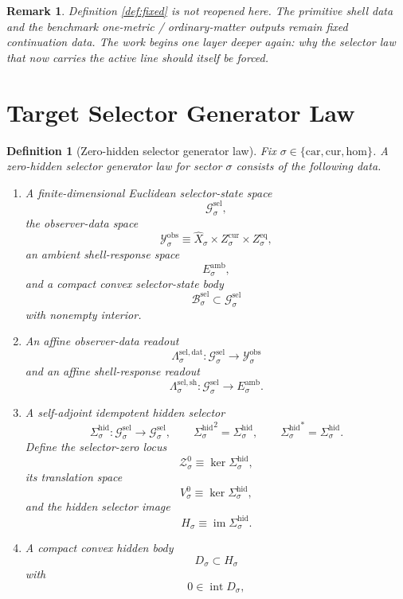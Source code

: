 \documentclass[11pt]{article}
\newcommand{\Car}{\mathrm{car}}
\newcommand{\Cur}{\mathrm{cur}}
\newcommand{\Hom}{\mathrm{hom}}
\newcommand{\VisibleAffine}[1]{\widehat X_{#1}}
\newcommand{\DataSpace}[1]{\mathcal Y_{#1}^{\mathrm{obs}}}
\newcommand{\AmbientTarget}[1]{E_{#1}^{\mathrm{amb}}}
\newcommand{\GapSpace}[1]{H_{#1}}
\newcommand{\GapBody}[1]{D_{#1}}
\newcommand{\GenSpace}[1]{\mathcal G_{#1}^{\mathrm{sel}}}
\newcommand{\GenBody}[1]{\mathcal B_{#1}^{\mathrm{sel}}}
\newcommand{\GenData}[1]{\Lambda_{#1}^{\mathrm{sel,dat}}}
\newcommand{\GenShell}[1]{\Lambda_{#1}^{\mathrm{sel,sh}}}
\newcommand{\HiddenSel}[1]{\Sigma_{#1}^{\mathrm{hid}}}
\newcommand{\ZeroHiddenSlice}[1]{\mathcal Z_{#1}^{0}}
\newcommand{\ZeroHiddenVec}[1]{V_{#1}^{0}}
\newtheorem{definition}{Definition}
\newtheorem{remark}{Remark}
\begin{document}
\begin{remark}
Definition \ref{def:fixed} is not reopened here. The primitive shell data and the benchmark one-metric / ordinary-matter outputs remain fixed continuation data. The work begins one layer deeper again: why the selector law that now carries the active line should itself be forced.
\end{remark}

\section{Target Selector Generator Law}

\begin{definition}[Zero-hidden selector generator law]
\label{def:generator}
Fix \(\sigma\in\{\Car,\Cur,\Hom\}\). A \emph{zero-hidden selector generator law} for sector \(\sigma\) consists of the following data.
\begin{enumerate}
    \item A finite-dimensional Euclidean selector-state space
    \[
    \GenSpace{\sigma},
    \]
    the observer-data space
    \[
    \DataSpace{\sigma}
    \equiv
    \VisibleAffine{\sigma}\times Z_{\sigma}^{\mathrm{cur}}\times Z_{\sigma}^{\mathrm{eq}},
    \]
    an ambient shell-response space
    \[
    \AmbientTarget{\sigma},
    \]
    and a compact convex selector-state body
    \[
    \GenBody{\sigma}\subset\GenSpace{\sigma}
    \]
    with nonempty interior.
    \item An affine observer-data readout
    \[
    \GenData{\sigma}:\GenSpace{\sigma}\to\DataSpace{\sigma}
    \]
    and an affine shell-response readout
    \[
    \GenShell{\sigma}:\GenSpace{\sigma}\to\AmbientTarget{\sigma}.
    \]
    \item A self-adjoint idempotent hidden selector
    \[
    \HiddenSel{\sigma}:\GenSpace{\sigma}\to\GenSpace{\sigma},
    \qquad
    {\HiddenSel{\sigma}}^{2}=\HiddenSel{\sigma},
    \qquad
    {\HiddenSel{\sigma}}^{*}=\HiddenSel{\sigma}.
    \]
    Define the selector-zero locus
    \[
    \ZeroHiddenSlice{\sigma}
    \equiv
    \ker\HiddenSel{\sigma},
    \]
    its translation space
    \[
    \ZeroHiddenVec{\sigma}
    \equiv
    \ker\HiddenSel{\sigma},
    \]
    and the hidden selector image
    \[
    \GapSpace{\sigma}
    \equiv
    \operatorname{im}\HiddenSel{\sigma}.
    \]
    \item A compact convex hidden body
    \[
    \GapBody{\sigma}\subset\GapSpace{\sigma}
    \]
    with
    \[
    0\in\operatorname{int}\GapBody{\sigma},
\]
\end{enumerate}
\end{definition}
\end{document}
